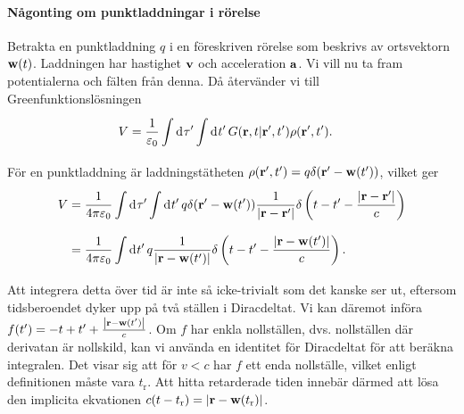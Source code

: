 \paragraph{Någonting om punktladdningar i rörelse}
Betrakta en punktladdning $q$ i en föreskriven rörelse som beskrivs av ortsvektorn $\vb{w}(t)$. Laddningen har hastighet $\vb{v}$ och acceleration $\vb{a}$. Vi vill nu ta fram potentialerna och fälten från denna. Då återvänder vi till Greenfunktionslösningen
\begin{align*}
	V &= \frac{1}{\varepsilon_{0}}\int\limits_{}^{}\dd[]{\tau'}\int\limits_{}^{}\dd[]{t'}G(\vb{r}, t | \vb{r}', t')\rho(\vb{r}', t').
\end{align*}
För en punktladdning är laddningstätheten $\rho(\vb{r}', t') = q\delta(\vb{r}' - \vb{w}(t'))$, vilket ger
\begin{align*}
	V &= \frac{1}{4\pi\varepsilon_{0}}\int\limits_{}^{}\dd[]{\tau'}\int\limits_{}^{}\dd[]{t'}q\delta(\vb{r}' - \vb{w}(t'))\frac{1}{\abs{\vb{r} - \vb{r}'}}\delta\left(t - t' - \frac{\abs{\vb{r} - \vb{r}'}}{c}\right) \\
	  &= \frac{1}{4\pi\varepsilon_{0}}\int\limits_{}^{}\dd[]{t'}q\frac{1}{\abs{\vb{r} - \vb{w}(t')}}\delta\left(t - t' - \frac{\abs{\vb{r} - \vb{w}(t')}}{c}\right).
\end{align*}
Att integrera detta över tid är inte så icke-trivialt som det kanske ser ut, eftersom tidsberoendet dyker upp på två ställen i Diracdeltat. Vi kan däremot införa $f(t') = - t + t' + \frac{\abs{\vb{r} - \vb{w}(t')}}{c}$. Om $f$ har enkla nollställen, dvs. nollställen där derivatan är nollskild, kan vi använda en identitet för Diracdeltat för att beräkna integralen. Det visar sig att för $v < c$ har $f$ ett enda nollställe, vilket enligt definitionen måste vara $t_{\text{r}}$. Att hitta retarderade tiden innebär därmed att lösa den implicita ekvationen $c(t - t_{\text{r}}) = \abs{\vb{r} - \vb{w}(t_{\text{r}})}$.

